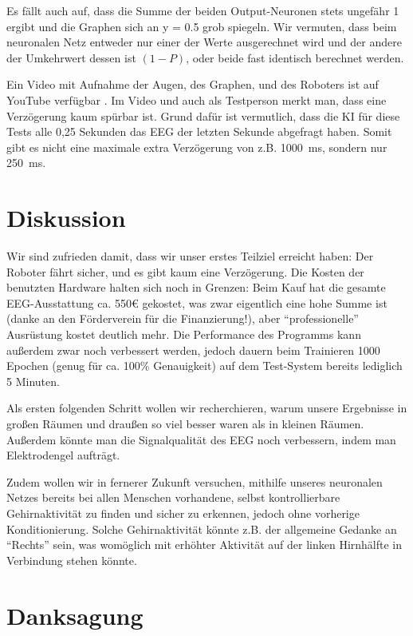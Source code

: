 \documentclass[10pt]{scrartcl}
\begin{document}
	Es fällt auch auf, dass die Summe der beiden Output-Neuronen stets ungefähr 1 ergibt und die Graphen sich an y = 0.5 grob spiegeln. Wir vermuten, dass beim neuronalen Netz entweder nur einer der Werte ausgerechnet wird und der andere der Umkehrwert dessen ist $\left(1 - P\right)$, oder beide fast identisch berechnet werden.
	
	Ein Video mit Aufnahme der Augen, des Graphen, und des Roboters ist auf YouTube verfügbar \cite{projekt-video}. Im Video und auch als Testperson merkt man, dass eine Verzögerung kaum spürbar ist. Grund dafür ist vermutlich, dass die KI für diese Tests alle 0,25 Sekunden das EEG der letzten Sekunde abgefragt  haben. Somit gibt es nicht eine maximale extra Verzögerung von z.B. \qty{1000}{\milli\second}, sondern nur \qty{250}{\milli\second}.

	\section{Diskussion}

	Wir sind zufrieden damit, dass wir unser erstes Teilziel erreicht haben: Der Roboter fährt sicher, und es gibt kaum eine Verzögerung. Die Kosten der benutzten Hardware halten sich noch in Grenzen: Beim Kauf hat die gesamte EEG-Ausstattung ca. 550€ gekostet, was zwar eigentlich eine hohe Summe ist (danke an den Förderverein für die Finanzierung!), aber \enquote{professionelle} Ausrüstung kostet deutlich mehr. Die Performance des Programms kann außerdem zwar noch verbessert werden, jedoch dauern beim Trainieren 1000 Epochen (genug für ca. 100\% Genauigkeit) auf dem Test-System bereits lediglich 5 Minuten. 

	Als ersten folgenden Schritt wollen wir recherchieren, warum unsere Ergebnisse in großen Räumen und draußen so viel besser waren als in kleinen Räumen. Außerdem könnte man die Signalqualität des EEG noch verbessern, indem man Elektrodengel aufträgt. 

	Zudem wollen wir in fernerer Zukunft versuchen, mithilfe unseres neuronalen Netzes bereits bei allen Menschen vorhandene, selbst kontrollierbare Gehirnaktivität zu finden und sicher zu erkennen, jedoch ohne vorherige Konditionierung. Solche Gehirnaktivität könnte z.B. der allgemeine Gedanke an \enquote{Rechts} sein, was womöglich mit erhöhter Aktivität auf der linken Hirnhälfte in Verbindung stehen könnte.
	
	\newpage

	\section{Danksagung}
\end{document}
